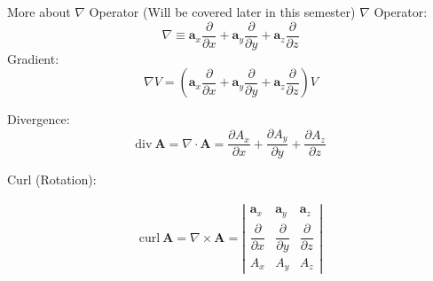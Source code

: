 \documentclass[10pt]{beamer}
\begin{document}
\begin{frame}[allowframebreaks]{ More about $\nabla$ Operator (Will be covered later in this semester)}
$\nabla$ Operator:
$$\nabla \equiv \mathbf{a}_x\dfrac{\partial }{\partial x} + \mathbf{a}_y\dfrac{\partial }{\partial y} + \mathbf{a}_z\dfrac{\partial }{\partial z}$$
Gradient:
$$\nabla V = \left(\mathbf{a}_x\dfrac{\partial }{\partial x} + \mathbf{a}_y\dfrac{\partial }{\partial y} + \mathbf{a}_z\dfrac{\partial }{\partial z}\right) V$$

Divergence:
$$\text{div}~\mathbf{A} = \nabla\cdot \mathbf{A} = \dfrac{\partial A_x}{\partial x} + \dfrac{\partial A_y}{\partial y} + \dfrac{\partial A_z}{\partial z} $$

Curl (Rotation):

\begin{align*}
\text{curl} ~\mathbf{A} = \nabla\times\mathbf{A} =\left\vert
\begin{matrix}
\mathbf{a}_x & \mathbf{a}_y & \mathbf{a}_z\\
\dfrac{\partial }{\partial x} & \dfrac{\partial }{\partial y} & \dfrac{\partial }{\partial z}\\
A_x & A_y & A_z
\end{matrix}
\right\vert
\end{align*}

\end{frame}
\end{document}
